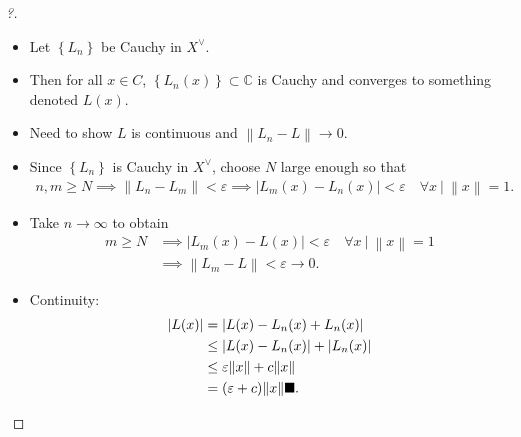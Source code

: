 \begin{proof}[?]

\envlist

\begin{itemize}
\item
  Let \(\left\{{L_{n}}\right\}\) be Cauchy in \(X^\vee\).
\item
  Then for all \(x\in C\),
  \(\left\{{L_{n}(x)}\right\} \subset {\mathbb{C}}\) is Cauchy and
  converges to something denoted \(L(x)\).
\item
  Need to show \(L\) is continuous and
  \({\left\lVert {L_{n} - L} \right\rVert} \to 0\).
\item
  Since \(\left\{{L_{n}}\right\}\) is Cauchy in \(X^\vee\), choose \(N\)
  large enough so that
  \begin{align*}
  n, m \geq N \implies {\left\lVert {L_{n} - L_{m}} \right\rVert} < \varepsilon \implies {\left\lvert {L_{m}(x) - L_{n}(x)} \right\rvert} < \varepsilon \quad \forall x {~\mathrel{\Big|}~}{\left\lVert {x} \right\rVert} = 1
  .\end{align*}
\item
  Take \(n\to \infty\) to obtain
  \begin{align*}m \geq N 
  &\implies {\left\lvert {L_{m}(x) - L(x)} \right\rvert} < \varepsilon \quad \forall x {~\mathrel{\Big|}~}{\left\lVert {x} \right\rVert} = 1\\
  &\implies {\left\lVert {L_{m} - L} \right\rVert} < \varepsilon \to 0
  .\end{align*}
\item
  Continuity:
  \begin{align*}
  {\left\lvert {L(x)} \right\rvert} &= {\left\lvert {L(x) - L_{n}(x) + L_{n}(x)} \right\rvert} \\
  &\leq  {\left\lvert {L(x) - L_{n}(x)} \right\rvert} + {\left\lvert {L_{n}(x)} \right\rvert} \\
  &\leq \varepsilon {\left\lVert {x} \right\rVert} + c{\left\lVert {x} \right\rVert} \\
  &= (\varepsilon + c){\left\lVert {x} \right\rVert} \hfill\blacksquare
  .\end{align*}
\end{itemize}

\end{proof}

